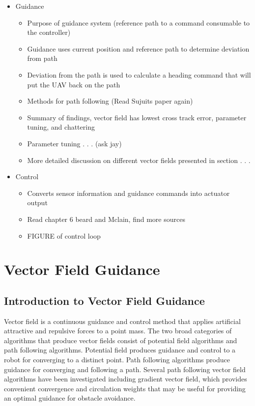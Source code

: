 \documentclass[numbered,pdftex]{ohio-etd}
\begin{document}
\begin{itemize}
\begin{itemize}
		\item Guidance
		\begin{itemize}
			\item Purpose of guidance system (reference path to a command consumable to the controller)
			\item Guidance uses current position and reference path to determine deviation from path
			\item Deviation from the path is used to calculate a heading command that will put the UAV back on the path
			\item Methods for path following (Read Sujuits paper again)
			\item Summary of findings, vector field has lowest cross track error, parameter tuning, and chattering
			\item Parameter tuning . . . (ask jay)
			\item More detailed discussion on different vector fields presented in section . . .
		\end{itemize}
	
		
		\item Control
		\begin{itemize}
			\item Converts sensor information and guidance commands into actuator output
			\item Read chapter 6 beard and Mclain, find more sources
			\item FIGURE of control loop
		\end{itemize}

		
	\end{itemize}
\end{itemize}




\section{Vector Field Guidance}

\subsection{Introduction to Vector Field Guidance}
Vector field is a continuous guidance and control method that applies artificial attractive and repulsive forces to a point mass. The two broad categories of algorithms that produce vector fields consist of potential field algorithms and path following algorithms. Potential field produces guidance and control to a robot for converging to a distinct point. Path following algorithms produce guidance for converging and following a path. Several path following vector field algorithms have been investigated including gradient vector field, which provides convenient convergence and circulation weights that may be useful for providing an optimal guidance for obstacle avoidance. 
\end{document}
